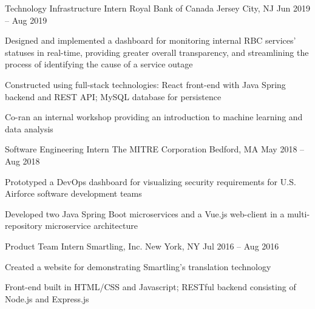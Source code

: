 

\begin{cventries}

  \cventry
  {Technology Infrastructure Intern}
  {Royal Bank of Canada}
  {Jersey City, NJ}
  {Jun 2019 -- Aug 2019}
  {
    \begin{cvitems}
      \item {Designed and implemented a dashboard for monitoring internal RBC services' statuses in real-time, providing greater overall transparency, and streamlining the process of identifying the cause of a service outage}
      \item {Constructed using full-stack technologies: React front-end with Java Spring backend and REST API; MySQL database for persistence}
      \item {Co-ran an internal workshop providing an introduction to machine learning and data analysis}
    \end{cvitems}
  }


  \cventry
  {Software Engineering Intern}
  {The MITRE Corporation}
  {Bedford, MA}
  {May 2018 -- Aug 2018}
  {
    \begin{cvitems}
      \item {Prototyped a DevOps dashboard for visualizing security requirements for U.S. Airforce software development teams}
      \item {Developed two Java Spring Boot microservices and a Vue.js web-client in a multi-repository microservice architecture}
    \end{cvitems}
  }


  \cventry
  {Product Team Intern}
  {Smartling, Inc.}
  {New York, NY}
  {Jul 2016 -- Aug 2016}
  {
    \begin{cvitems}
      \item Created a website for demonstrating Smartling's translation technology
      \item Front-end built in HTML/CSS and Javascript; RESTful backend consisting of Node.js and Express.js
    \end{cvitems}
  }


\end{cventries}